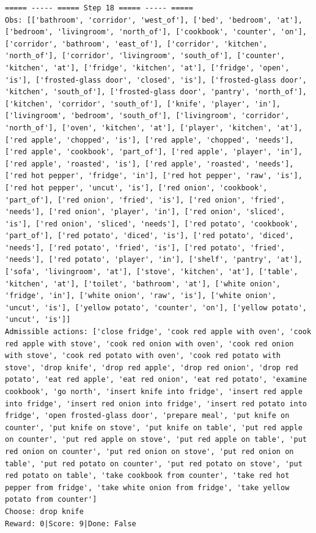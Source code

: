 \documentclass[11pt]{article}
\begin{document}
\begin{lstlisting}
===== ----- ===== Step 18 ===== ----- =====
Obs: [['bathroom', 'corridor', 'west_of'], ['bed', 'bedroom', 'at'], ['bedroom', 'livingroom', 'north_of'], ['cookbook', 'counter', 'on'], ['corridor', 'bathroom', 'east_of'], ['corridor', 'kitchen', 'north_of'], ['corridor', 'livingroom', 'south_of'], ['counter', 'kitchen', 'at'], ['fridge', 'kitchen', 'at'], ['fridge', 'open', 'is'], ['frosted-glass door', 'closed', 'is'], ['frosted-glass door', 'kitchen', 'south_of'], ['frosted-glass door', 'pantry', 'north_of'], ['kitchen', 'corridor', 'south_of'], ['knife', 'player', 'in'], ['livingroom', 'bedroom', 'south_of'], ['livingroom', 'corridor', 'north_of'], ['oven', 'kitchen', 'at'], ['player', 'kitchen', 'at'], ['red apple', 'chopped', 'is'], ['red apple', 'chopped', 'needs'], ['red apple', 'cookbook', 'part_of'], ['red apple', 'player', 'in'], ['red apple', 'roasted', 'is'], ['red apple', 'roasted', 'needs'], ['red hot pepper', 'fridge', 'in'], ['red hot pepper', 'raw', 'is'], ['red hot pepper', 'uncut', 'is'], ['red onion', 'cookbook', 'part_of'], ['red onion', 'fried', 'is'], ['red onion', 'fried', 'needs'], ['red onion', 'player', 'in'], ['red onion', 'sliced', 'is'], ['red onion', 'sliced', 'needs'], ['red potato', 'cookbook', 'part_of'], ['red potato', 'diced', 'is'], ['red potato', 'diced', 'needs'], ['red potato', 'fried', 'is'], ['red potato', 'fried', 'needs'], ['red potato', 'player', 'in'], ['shelf', 'pantry', 'at'], ['sofa', 'livingroom', 'at'], ['stove', 'kitchen', 'at'], ['table', 'kitchen', 'at'], ['toilet', 'bathroom', 'at'], ['white onion', 'fridge', 'in'], ['white onion', 'raw', 'is'], ['white onion', 'uncut', 'is'], ['yellow potato', 'counter', 'on'], ['yellow potato', 'uncut', 'is']]
Admissible actions: ['close fridge', 'cook red apple with oven', 'cook red apple with stove', 'cook red onion with oven', 'cook red onion with stove', 'cook red potato with oven', 'cook red potato with stove', 'drop knife', 'drop red apple', 'drop red onion', 'drop red potato', 'eat red apple', 'eat red onion', 'eat red potato', 'examine cookbook', 'go north', 'insert knife into fridge', 'insert red apple into fridge', 'insert red onion into fridge', 'insert red potato into fridge', 'open frosted-glass door', 'prepare meal', 'put knife on counter', 'put knife on stove', 'put knife on table', 'put red apple on counter', 'put red apple on stove', 'put red apple on table', 'put red onion on counter', 'put red onion on stove', 'put red onion on table', 'put red potato on counter', 'put red potato on stove', 'put red potato on table', 'take cookbook from counter', 'take red hot pepper from fridge', 'take white onion from fridge', 'take yellow potato from counter']
Choose: drop knife
Reward: 0|Score: 9|Done: False


\end{lstlisting}
\end{document}
